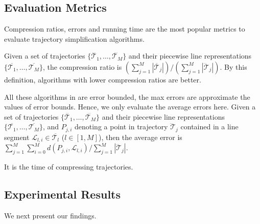 \subsection{Evaluation Metrics}
Compression ratios, errors and running time are the most popular metrics to evaluate trajectory simplification algorithms.

Given a set of trajectories $\{\dddot{\mathcal{T}_1}, \ldots, \dddot{\mathcal{T}_M}\}$ and their piecewise line representations $\{\overline{\mathcal{T}_1}, \ldots, \overline{\mathcal{T}_M}\}$,
the compression ratio is $(\sum_{j=1}^{M} |\overline{\mathcal{T}}_j |)/(\sum_{j=1}^{M} |\dddot{\mathcal{T}}_j |)$.
By this definition, algorithms with lower compression ratios are better.

All these algorithms in  are error bounded, \ie the max errors are approximate the values of error bounds. Hence, we only evaluate the average errors here. Given a set of trajectories $\{\dddot{\mathcal{T}_1}, \ldots, \dddot{\mathcal{T}_M}\}$ and their piecewise line representations
$\{\overline{\mathcal{T}_1}, \ldots, \overline{\mathcal{T}_M}\}$, and $P_{j,i}$ denoting
a point in trajectory $\dddot{\mathcal{T}}_j$ contained in a line segment $\mathcal{L}_{l,i}\in\overline{\mathcal{T}_l}$ ($l\in[1,M]$),
then the average error is $\sum_{j=1}^{M}\sum_{i=0}^{M} d(P_{j,i},
\mathcal{L}_{l,i})/\sum_{j=1}^{M}{|\dddot{\mathcal{T}}_j |}$.

It is the time of compressing trajectories.

\subsection{Experimental Results}
We next present our findings.


